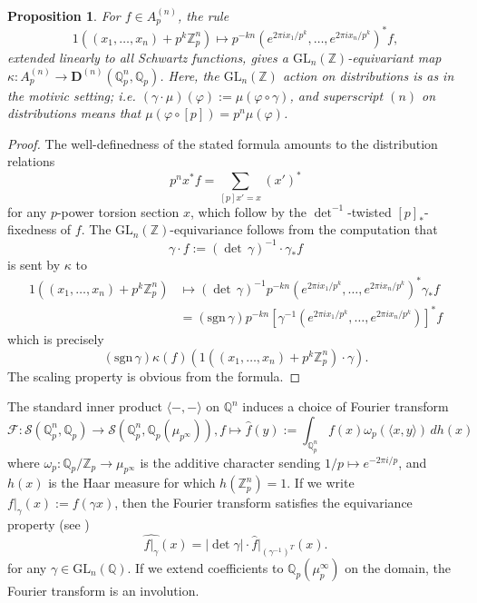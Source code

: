 \documentclass[10pt]{amsart}
\newtheorem{prop}[thm]{Proposition}
\theoremstyle{definition}
\newcommand{\Z}{\mathbb{Z}}
\newcommand{\Q}{\mathbb{Q}}
\newcommand{\D}{\mathbf{D}}
\newcommand{\sgn}{\mathrm{sgn}}
\newcommand{\cS}{\mathcal{S}}
\newcommand{\GL}{\mathrm{GL}}
\numberwithin{equation}{section}
\begin{document}
    \begin{prop} \label{prop:specialization}
        For $f\in A_p^{(n)}$, the rule
        \[
        1((x_1,\ldots, x_n) + p^k\Z_p^n) \mapsto p^{-kn}(e^{2\pi i x_1/p^k},\ldots, e^{2\pi i x_n/p^k})^* f,
        \]
        extended linearly to all Schwartz functions, gives a $\GL_n(\Z)$-equivariant map $\kappa: A_p^{(n)}\to \D^{(n)}(\Q_p^n,\Q_p)$. Here, the $\GL_n(\Z)$ action on distributions is as in the motivic setting; i.e. $(\gamma\cdot \mu)(\varphi) := \mu(\varphi\circ \gamma)$, and superscript $(n)$ on distributions means that $\mu(\varphi\circ [p]) = p^n\mu(\varphi)$.
    \end{prop}
    \begin{proof}
        The well-definedness of the stated formula amounts to the distribution relations
        \[
        p^n x^*f = \sum_{[p]x'=x} (x')^*
        \]
        for any $p$-power torsion section $x$, which follow by the $\det^{-1}$-twisted $[p]_*$-fixedness of $f$. The $\GL_n(\Z)$-equivariance follows from the computation that
        \[
        \gamma\cdot f := (\det\,\gamma)^{-1} \cdot \gamma_* f
        \]
        is sent by $\kappa$ to
        \begin{align}
            1((x_1,\ldots, x_n)+ p^k\Z_p^n) & \mapsto (\det\,\gamma)^{-1} p^{-kn} (e^{2\pi i x_1/p^k},\ldots, e^{2\pi i x_n/p^k})^* \gamma_* f \\
            & = (\sgn\,\gamma) p^{-kn} [\gamma^{-1}(e^{2\pi i x_1/p^k},\ldots, e^{2\pi i x_n/p^k})]^* f 
        \end{align}
        which is precisely 
        \[
        (\sgn\,\gamma)
        \kappa(f)(1((x_1,\ldots, x_n)+ p^k\Z_p^n) \cdot \gamma).
        \]
        The scaling property is obvious from the formula.
    \end{proof}


    The standard inner product $\langle-,-\rangle$ on $\Q^n$ induces a choice of Fourier transform 
    \[
    \mathscr{F}: \cS(\Q_p^n, \Q_p)\to \cS(\Q_p^n,\Q_p(\mu_{p^\infty})), f\mapsto \widehat{f}(y):= \int_{\Q_p^n}f(x) \omega_p(\langle x, y\rangle)\, dh(x)
    \]
    where $\omega_p:\Q_p/\Z_p\to \mu_{p^\infty}$ is the additive character sending $1/p\mapsto e^{-2\pi i/p}$, and $h(x)$ is the Haar measure for which $h(\Z_p^n)=1$. If we write $f|_\gamma(x):=f(\gamma x)$, then the Fourier transform satisfies the equivariance property (see \cite[Appendix A]{LP})
    \[
    \widehat{f|_\gamma}(x)= |\det \gamma|\cdot \widehat{f}|_{(\gamma^{-1})^T}(x). 
    \]
    for any $\gamma\in \GL_n(\Q)$. If we extend coefficients to $\Q_p(\mu_p^{\infty})$ on the domain, the Fourier transform is an involution.
\end{document}
